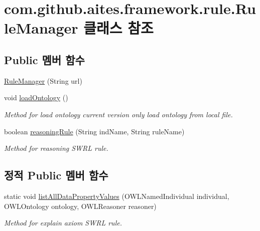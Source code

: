 \hypertarget{classcom_1_1github_1_1aites_1_1framework_1_1rule_1_1_rule_manager}{}\section{com.\+github.\+aites.\+framework.\+rule.\+Rule\+Manager 클래스 참조}
\label{classcom_1_1github_1_1aites_1_1framework_1_1rule_1_1_rule_manager}
\subsection*{Public 멤버 함수}
\begin{DoxyCompactItemize}
\item 
\mbox{\hyperlink{classcom_1_1github_1_1aites_1_1framework_1_1rule_1_1_rule_manager_a3411f477cdcd70130bd010a7ab4dac9f}{Rule\+Manager}} (String url)
\item 
void \mbox{\hyperlink{classcom_1_1github_1_1aites_1_1framework_1_1rule_1_1_rule_manager_a864b1fcad12d92c290abf1c5c4e7ce8a}{load\+Ontology}} ()
\begin{DoxyCompactList}\small\item\em Method for load ontology current version only load ontology from local file. \end{DoxyCompactList}\item 
boolean \mbox{\hyperlink{classcom_1_1github_1_1aites_1_1framework_1_1rule_1_1_rule_manager_a61cbbdc8264de5d080789cc387be669c}{reasoning\+Rule}} (String ind\+Name, String rule\+Name)
\begin{DoxyCompactList}\small\item\em Method for reasoning S\+W\+RL rule. \end{DoxyCompactList}\end{DoxyCompactItemize}
\subsection*{정적 Public 멤버 함수}
\begin{DoxyCompactItemize}
\item 
static void \mbox{\hyperlink{classcom_1_1github_1_1aites_1_1framework_1_1rule_1_1_rule_manager_a941721d9a39297d18a1698016dda6e05}{list\+All\+Data\+Property\+Values}} (O\+W\+L\+Named\+Individual individual, O\+W\+L\+Ontology ontology, O\+W\+L\+Reasoner reasoner)
\begin{DoxyCompactList}\small\item\em Method for explain axiom S\+W\+RL rule. \end{DoxyCompactList}\end{DoxyCompactItemize}
